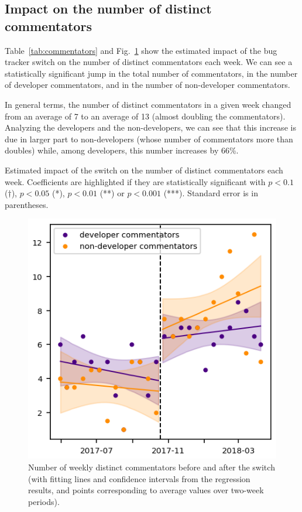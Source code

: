 \documentclass[conference]{IEEEtran}
\begin{document}
\subsection{Impact on the number of distinct commentators}

Table~\ref{tab:commentators} and Fig.~\ref{commentator_nb_rd} show the estimated impact of the bug tracker switch on the number of distinct commentators each week. We can see a statistically significant jump in the total number of commentators, in the number of developer commentators, and in the number of non-developer commentators.

In general terms, the number of distinct commentators in a given week changed from an average of 7 to an average of 13 (almost doubling the commentators). Analyzing the developers and the non-developers, we can see that this increase is due in larger part to non-developers (whose number of commentators more than doubles) while, among developers, this number increases by 66\%.

\begin{table}
\centering
\caption{Estimated impact of the switch on the number of distinct commentators each week. Coefficients are highlighted if they are statistically significant with $p<0.1$ ($\dagger$), $p<0.05$ (*), $p<0.01$ (**) or $p<0.001$ (***). Standard error is in parentheses.}
\label{tab:commentators}

\end{table}


\begin{figure}
\includegraphics{commentator_nb_rd.png}
\caption{Number of weekly distinct commentators before and after the switch (with fitting lines and confidence intervals from the regression results, and points corresponding to average values over two-week periods).} \label{commentator_nb_rd}
\end{figure}
\end{document}
